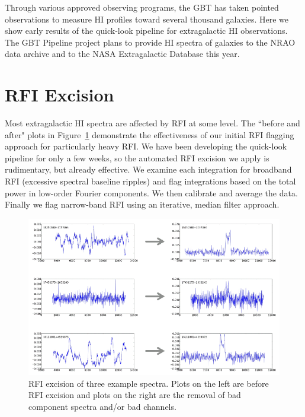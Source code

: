 Through various approved observing programs, the GBT has taken pointed observations to measure HI profiles toward several thousand galaxies. Here we show early results of the quick-look pipeline for extragalactic HI observations. The GBT Pipeline project plans to provide HI spectra of galaxies to the NRAO data archive and to the NASA Extragalactic Database this year.

\section{RFI Excision}

Most extragalactic HI spectra are affected by RFI at some level.  The ``before and after" plots in Figure~\ref{fig:RFIfigure} demonstrate the effectiveness of our initial RFI flagging approach for particularly heavy RFI.  We have been developing the quick-look pipeline for only a few weeks, so the automated RFI excision we apply is rudimentary, but already effective. We examine each integration for broadband RFI (excessive spectral baseline ripples) and flag integrations based on the total power in low-order Fourier components. We then calibrate and average the data. Finally we flag narrow-band RFI using an iterative, median filter approach.

\begin{figure}[ht!]
\centering%
\includegraphics[width=5in]{part7/Masters_P66/P66_f1}
\caption{RFI excision of three example spectra.  Plots on the left are before RFI excision and plots on the right are the removal of bad component spectra and/or bad channels.}
\label{fig:RFIfigure}
\end{figure}

